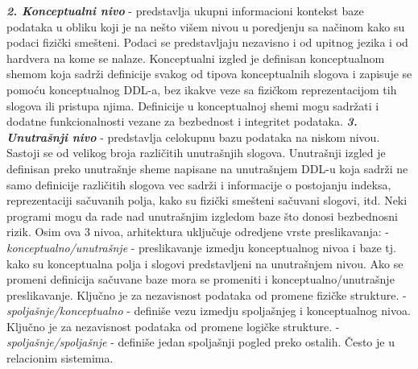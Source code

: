 \documentclass{article}
\begin{document}
\textbf{\textit{2. Konceptualni nivo}} - predstavlja ukupni
informacioni kontekst baze podataka u obliku koji je na nešto višem
nivou u poredjenju sa načinom kako su podaci fizički smešteni. Podaci
se predstavljaju nezavisno i od upitnog jezika i od hardvera na kome se
nalaze. Konceptualni izgled je definisan konceptualnom shemom koja
sadrži definicije svakog od tipova konceptualnih slogova i zapisuje se
pomoću konceptualnog DDL-a, bez ikakve veze sa fizičkom reprezentacijom
tih slogova ili pristupa njima. Definicije u konceptualnoj shemi mogu
sadržati i dodatne funkcionalnosti vezane za bezbednost i integritet
podataka.
\newline \hspace*{0.2cm}
\textbf{\textit{3. Unutrašnji nivo}} - predstavlja celokupnu bazu
podataka na niskom nivou. Sastoji se od velikog broja različitih
unutrašnjih slogova. Unutrašnji izgled je definisan preko unutrašnje
sheme napisane na unutrašnjem DDL-u koja sadrži ne samo definicije
različitih slogova vec sadrži i informacije o postojanju indeksa,
reprezentaciji sačuvanih polja, kako su fizički smešteni sačuvani
slogovi, itd. Neki programi mogu da rade nad unutrašnjim izgledom baze
što donosi bezbednosni rizik.
\newline
Osim ova 3 nivoa,
arhitektura uključuje odredjene vrste preslikavanja:
\newline \hspace*{0.2cm}
- \textit{konceptualno/unutrašnje} - preslikavanje izmedju
konceptualnog nivoa i baze tj. kako su konceptualna polja i slogovi
predstavljeni na unutrašnjem nivou. Ako se promeni definicija sačuvane
baze mora se promeniti i konceptualno/unutrašnje preslikavanje. Ključno
je za nezavisnost podataka od promene fizičke strukture.
\newline \hspace*{0.2cm}
- \textit{spoljašnje/konceptualno} - definiše vezu izmedju spoljašnjeg
i konceptualnog nivoa. Ključno je za nezavisnost podataka od promene
logičke strukture.
\newline \hspace*{0.2cm}
- \textit{spoljašnje/spoljašnje} - definiše jedan spoljašnji pogled
preko ostalih. Često je u relacionim sistemima.
\end{document}
